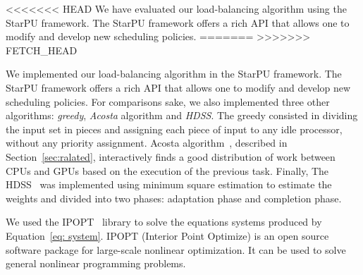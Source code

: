 \documentclass[journal]{IEEEtran}
\begin{document}

<<<<<<< HEAD
We have evaluated our load-balancing algorithm using the StarPU framework.
The StarPU framework offers a rich API that allows one to modify and develop new scheduling policies.
=======
>>>>>>> FETCH_HEAD
%
%

We implemented our load-balancing algorithm in the StarPU framework. The StarPU
framework offers a rich API that allows one to modify and develop new scheduling
policies. For comparisons sake, we also implemented three other algorithms:
\emph{greedy}, \emph{Acosta} algorithm and \emph{HDSS}. The greedy consisted in
dividing the input set in pieces and assigning each piece of input to any idle
processor, without any priority assignment. Acosta algorithm~\cite{acosta},
described in Section~\ref{sec:ralated}, interactively finds a good distribution
of work between CPUs and GPUs based on the execution of the previous task.
Finally, The HDSS~\cite{HDSS} was implemented using minimum square estimation to
estimate the weights and divided into two phases: adaptation phase and
completion phase.

We used the IPOPT~\cite{point} library to solve the equations systems produced
by Equation~\ref{eq: system}. IPOPT (Interior Point Optimize) is an open source
software package for large-scale nonlinear optimization. It can be used to solve
general nonlinear programming problems.

\end{document}
